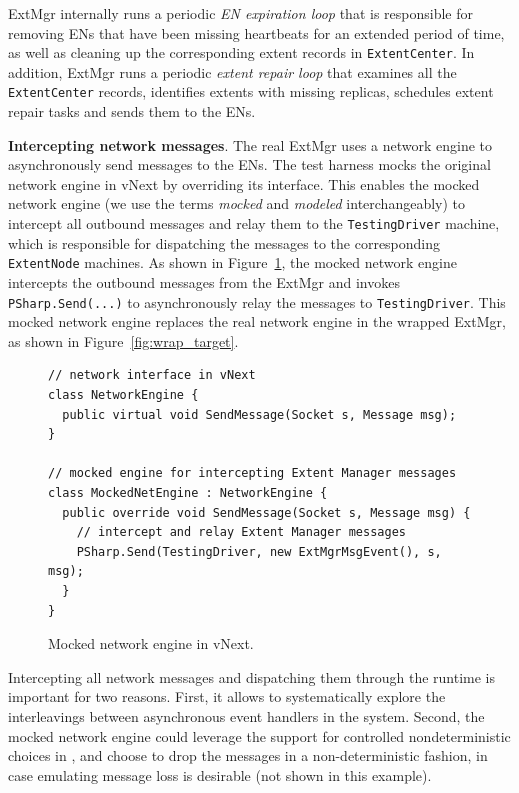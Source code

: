 ExtMgr internally runs a periodic \emph{EN expiration loop} that is responsible for removing ENs that have been missing heartbeats for an extended period of time, as well as cleaning up the corresponding extent records in \texttt{ExtentCenter}. In addition, ExtMgr runs a periodic \emph{extent repair loop} that examines all the \texttt{ExtentCenter} records, identifies extents with missing replicas, schedules extent repair tasks and sends them to the ENs.

\textbf{Intercepting network messages}.
The real ExtMgr uses a network engine to asynchronously send messages to the ENs. The \psharp test harness mocks the original network engine in vNext by overriding its interface. This enables the mocked network engine (we use the terms \textit{mocked} and \textit{modeled} interchangeably) to intercept all outbound messages and relay them to the \texttt{TestingDriver} machine, which is responsible for dispatching the messages to the corresponding \texttt{ExtentNode} machines. As shown in Figure~\ref{fig:enginecode}, the mocked network engine intercepts the outbound messages from the ExtMgr and invokes \texttt{PSharp.Send(...)} to asynchronously relay the messages to \texttt{TestingDriver}. This mocked network engine replaces the real network engine in the wrapped ExtMgr, as shown in Figure~\ref{fig:wrap_target}.

\begin{figure}[t]
\begin{lstlisting}
// network interface in vNext
class NetworkEngine {
  public virtual void SendMessage(Socket s, Message msg);
}

// mocked engine for intercepting Extent Manager messages
class MockedNetEngine : NetworkEngine {
  public override void SendMessage(Socket s, Message msg) {
    // intercept and relay Extent Manager messages
    PSharp.Send(TestingDriver, new ExtMgrMsgEvent(), s, msg);
  }
}
\end{lstlisting}
\vspace{-4mm}
\caption{Mocked network engine in vNext.}
\label{fig:enginecode}
\vspace{-2mm}
\end{figure}

Intercepting all network messages and dispatching them through the \psharp runtime is important for two reasons. First, it allows \psharp to systematically explore the interleavings between asynchronous event handlers in the system. Second, the mocked network engine could leverage the support for controlled nondeterministic choices in \psharp, and choose to drop the messages in a non-deterministic fashion, in case emulating message loss is desirable (not shown in this example).

